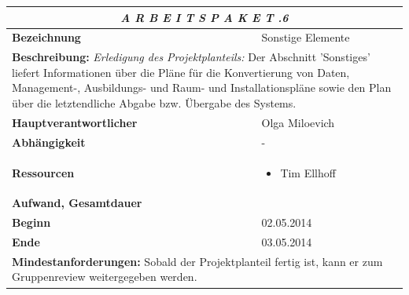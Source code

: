 \documentclass[fontsize=12pt,paper=a4,twoside]{scrartcl}
\begin{document}
\begin{tabular}{p{7.5cm}|p{7.5cm}}\toprule
\multicolumn{2}{c}{\textbf{\textit{A R B E I T S P A K E T \quad 1.1.6}}} \\ \toprule \hline
\textbf{Bezeichnung} & Sonstige Elemente\\\hline
\multicolumn{2}{p{15cm}}{\textbf{Beschreibung:} \newline 
\textit{Erledigung des Projektplanteils:} Der Abschnitt 'Sonstiges' liefert Informationen über die Pläne für die Konvertierung von Daten, Management-, Ausbildungs- und Raum- und Installationspläne sowie den Plan über die letztendliche Abgabe bzw. Übergabe des Systems. }  \\\hline
\textbf{Hauptverantwortlicher} & Olga Miloevich \\\hline
\textbf{Abhängigkeit} & -\\\hline
\textbf{Ressourcen} & \begin{itemize} 
\itemsep0pt
\item Tim Ellhoff
\end{itemize} \\\hline
\textbf{Aufwand, Gesamtdauer} & \\\hline
\textbf{Beginn} & 02.05.2014 \\\hline
\textbf{Ende} & 03.05.2014\\\hline
\multicolumn{2}{p{15cm}}{\textbf{Mindestanforderungen: } \newline
Sobald der Projektplanteil fertig ist, kann er zum Gruppenreview weitergegeben werden. }  \\ \toprule
\end{tabular} \\\\
\end{document}
